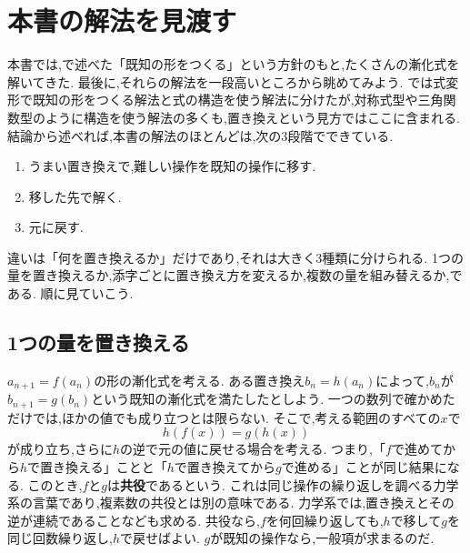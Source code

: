 
\section{本書の解法を見渡す}\label{節：本書の解法を見渡す}

本書では,で述べた「既知の形をつくる」という方針のもと,たくさんの漸化式を解いてきた.
最後に,それらの解法を一段高いところから眺めてみよう.
では式変形で既知の形をつくる解法と式の構造を使う解法に分けたが,対称式型や三角関数型のように構造を使う解法の多くも,置き換えという見方ではここに含まれる.
結論から述べれば,本書の解法のほとんどは,次の3段階でできている.
\begin{enumerate}
  \item うまい置き換えで,難しい操作を既知の操作に移す.
  \item 移した先で解く.
  \item 元に戻す.
\end{enumerate}
違いは「何を置き換えるか」だけであり,それは大きく3種類に分けられる.
1つの量を置き換えるか,添字ごとに置き換え方を変えるか,複数の量を組み替えるか,である.
順に見ていこう.

\subsection{1つの量を置き換える}\label{節：1つの量を置き換える}

$a_{n+1}=f(a_n)$の形の漸化式を考える.
ある置き換え$b_n=h(a_n)$によって,$b_n$が$b_{n+1}=g(b_n)$という既知の漸化式を満たしたとしよう.
一つの数列で確かめただけでは,ほかの値でも成り立つとは限らない.
そこで,考える範囲のすべての$x$で
\[
  h(f(x))=g(h(x))
\]
が成り立ち,さらに$h$の逆で元の値に戻せる場合を考える.
つまり,「$f$で進めてから$h$で置き換える」ことと「$h$で置き換えてから$g$で進める」ことが同じ結果になる.
このとき,$f$と$g$は\textbf{共役}であるという.
これは同じ操作の繰り返しを調べる力学系の言葉であり,複素数の共役とは別の意味である.
力学系では,置き換えとその逆が連続であることなども求める.
共役なら,$f$を何回繰り返しても,$h$で移して$g$を同じ回数繰り返し,$h$で戻せばよい.
$g$が既知の操作なら,一般項が求まるのだ.


